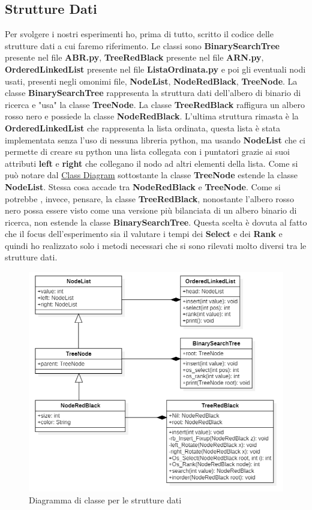 \documentclass[10pt]{article}
\begin{document}
\subsection{Strutture Dati}
Per svolgere i nostri esperimenti ho, prima di tutto, scritto il codice delle strutture dati a cui faremo riferimento.
Le classi sono \textbf{BinarySearchTree} presente nel file \textbf{ABR.py}, \textbf{TreeRedBlack} presente nel file \textbf{ARN.py}, \textbf{OrderedLinkedList} presente nel file \textbf{ListaOrdinata.py} e poi gli eventuali nodi usati, presenti negli omonimi file, \textbf{NodeList}, \textbf{NodeRedBlack}, \textbf{TreeNode}. La classe \textbf{BinarySearchTree} rappresenta la struttura dati dell'albero di binario di ricerca e "usa" la classe \textbf{TreeNode}. La classe \textbf{TreeRedBlack} raffigura un albero rosso nero e possiede la classe \textbf{NodeRedBlack}. L'ultima struttura rimasta è la \textbf{OrderedLinkedList} che rappresenta la lista ordinata, questa lista è stata implementata senza l'uso di nessuna libreria python, ma usando \textbf{NodeList} che ci permette di creare su python una lista collegata con i puntatori grazie ai suoi attributi \textbf{left} e \textbf{right} che collegano il nodo ad altri elementi della lista. Come si può notare dal \hyperref[strDatiDiagram]{ Class Diagram} sottostante la classe \textbf{TreeNode} estende la classe \textbf{NodeList}. Stessa cosa accade tra \textbf{NodeRedBlack} e \textbf{TreeNode}. Come si potrebbe , invece, pensare, la classe \textbf{TreeRedBlack}, nonostante l'albero rosso nero possa essere visto come una versione più bilanciata di un albero binario di ricerca, non estende la classe \textbf{BinarySearchTree}. Questa scelta è dovuta al fatto che il focus dell'esperimento sia il valutare i tempi dei \textbf{Select} e dei \textbf{Rank} e quindi ho realizzato solo i metodi necessari che si sono rilevati molto diversi tra le strutture dati. 
\begin{figure}[H]
    \centering
    \includegraphics[width=1\linewidth]{resources/StrDiagramm.png}
    \caption{Diagramma di classe per le strutture dati}
    \label{strDatiDiagram}
\end{figure}
\end{document}
